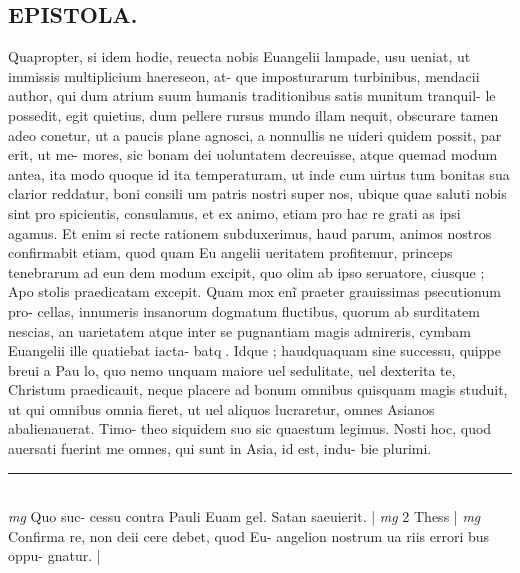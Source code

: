 \documentclass{article}
\begin{document}
\begin{pages}
\section*{EPISTOLA.  }\pstart Quapropter, si idem hodie, reuecta nobis Euangelii lampade, usu ueniat, ut immissis multiplicium haereseon, at- que  imposturarum turbinibus, mendacii author, qui dum atrium suum humanis traditionibus satis munitum tranquil- le possedit, egit quietius, dum pellere rursus mundo illam nequit, obscurare tamen adeo conetur, ut a paucis plane agnosci, a nonnullis ne uideri quidem possit, par erit, ut me- mores, sic bonam dei uoluntatem decreuisse, atque  quemad modum antea, ita modo quoque  id ita temperaturam, ut inde cum uirtus tum bonitas sua clarior reddatur, boni consili um patris nostri super nos, ubique  quae saluti nobis sint pro spicientis, consulamus, et ex animo, etiam pro hac re grati as ipsi agamus. Et enim si recte rationem subduxerimus, haud parum, animos nostros confirmabit etiam, quod quam Eu angelii ueritatem profitemur, princeps tenebrarum ad eun dem modum excipit, quo olim ab ipso seruatore, ciusque ; Apo stolis praedicatam excepit.   \pend\pstart Quam mox enĩ praeter grauissimas psecutionum pro- cellas, innumeris insanorum dogmatum fluctibus, quorum ab surditatem nescias, an uarietatem atque  inter se pugnantiam magis admireris, cymbam Euangelii ille quatiebat iacta- batq. Idque ; haudquaquam sine successu, quippe breui a Pau lo, quo nemo unquam maiore uel sedulitate, uel dexterita te, Christum praedicauit, neque  placere ad bonum omnibus quisquam magis studuit, ut qui omnibus   omnia fieret, ut uel aliquos lucraretur, omnes Asianos abalienauerat.  Timo- theo siquidem suo sic quaestum legimus.  Nosti hoc, quod auersati fuerint me omnes, qui sunt in Asia, id est, indu- bie plurimi.   \pend
\vspace{0.5cm}\noindent
\vspace{0.2cm}\rule{1cm}{0.2pt}\\ 
\hspace{0.2cm}\textit{mg}
\footnotesize Quo suc- cessu contra Pauli Euam gel.  Satan saeuierit.  
\normalsize| 
\hspace{0.2cm}\textit{mg}
\footnotesize 2 Thess 
\normalsize| 
\hspace{0.2cm}\textit{mg}
\footnotesize Confirma re, non deii cere debet, quod Eu- angelion nostrum ua riis errori bus oppu- gnatur.  
\normalsize| 

\end{pages}
\end{document}
